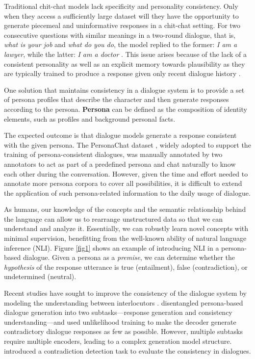 \documentclass[letterpaper]{article} \usepackage{aaai23}  \usepackage{times}  \usepackage{helvet}  \usepackage{courier}  \usepackage[hyphens]{url}  \usepackage{graphicx} \urlstyle{rm} \def\UrlFont{\rm}  \usepackage{natbib}  \usepackage{caption} \frenchspacing  \setlength{\pdfpagewidth}{8.5in}  \setlength{\pdfpageheight}{11in}  \usepackage{algorithm}
\begin{document}
Traditional chit-chat models lack specificity and personality consistency. Only when they access a sufficiently large dataset will they have the opportunity to generate piecemeal and uninformative responses in a chit-chat setting. For two consecutive questions with similar meanings in a two-round dialogue, that is, \textit{what is your job} and \textit{what do you do}, the model replied to the former: \textit{I am a lawyer}, while the latter: \textit{I am a doctor} \cite{Welleck2020}. This issue arises because of the lack of a consistent personality as well as an explicit memory towards plausibility as they are typically trained to produce a response given only recent dialogue history \cite{Shum2018}.

One solution that maintains consistency in a dialogue system is to provide a set of persona profiles that describe the character and then generate responses according to the persona. \textbf{Persona} can be defined as the composition of identity elements, such as profiles and background personal facts.

The expected outcome is that dialogue models generate a response consistent with the given persona. The PersonaChat dataset \cite{Zhang2018}, widely adopted to support the training of persona-consistent dialogues, was manually annotated by two annotators to act as part of a predefined persona and chat naturally to know each other during the conversation. However, given the time and effort needed to annotate more persona corpora to cover all possibilities, it is difficult to extend the application of such persona-related information to the daily usage of dialogue.

As humans, our knowledge of the concepts and the semantic relationship behind the language can allow us to rearrange unstructured data so that we can understand and analyze it. Essentially, we can robustly learn novel concepts with minimal supervision, benefitting from the well-known ability of natural language inference (NLI). Figure \ref{fig1} shows an example of introducing NLI in a persona-based dialogue. Given a persona as a \textit{premise}, we can determine whether the \textit{hypothesis} of the response utterance is true (entailment), false (contradiction), or undetermined (neutral). 

Recent studies have sought to improve the consistency of the dialogue system by modeling the understanding between interlocutors \cite{Liu2020}. \citet{Song2021} disentangled persona-based dialogue generation into two subtasks—response generation and consistency understanding—and used unlikelihood training to make the decoder generate contradictory dialogue responses as few as possible. However, multiple subtasks require multiple encoders, leading to a complex generation model structure. \citet{Nie2021_} introduced a contradiction detection task to evaluate the consistency in dialogues.
\end{document}
